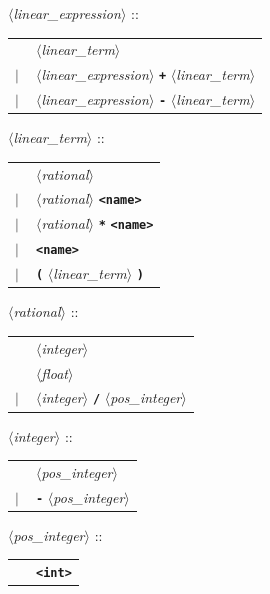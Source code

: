 \documentclass[a4paper,11pt]{article}
\newcommand{\nt}[1]{$\langle$\emph{#1}$\rangle$}
\newcommand{\regleGrammaire}[1]{\bigskip \noindent \nt{#1} :: \\}
\newcommand{\code}[1]{\textbf{\texttt{#1}}}
\begin{document}
\regleGrammaire{linear\_expression}
\begin{tabular}{l l}
	\  & \nt{linear\_term} \\
	$|$ & \nt{linear\_expression} \code{+} \nt{linear\_term} \\
	$|$ & \nt{linear\_expression} \code{-} \nt{linear\_term} \\
\end{tabular}

\regleGrammaire{linear\_term}
\begin{tabular}{l l}
	\  & \nt{rational} \\
	$|$ & \nt{rational} \code{<name>} \\
	$|$ & \nt{rational} \code{*} \code{<name>} \\
	$|$ & \code{<name>} \\
	$|$ & \code{(} \nt{linear\_term} \code{)} \\
\end{tabular}

\regleGrammaire{rational}
\begin{tabular}{l l}
	\  & \nt{integer} \\
	\  & \nt{float} \\
	$|$ & \nt{integer} \code{/} \nt{pos\_integer}  \\
\end{tabular}

\regleGrammaire{integer}
\begin{tabular}{l l}
	\  & \nt{pos\_integer} \\
	$|$ & \code{-} \nt{pos\_integer}  \\
\end{tabular}

\regleGrammaire{pos\_integer}
\begin{tabular}{l l}
	\  & \code{<int>} \\
\end{tabular}
\end{document}
